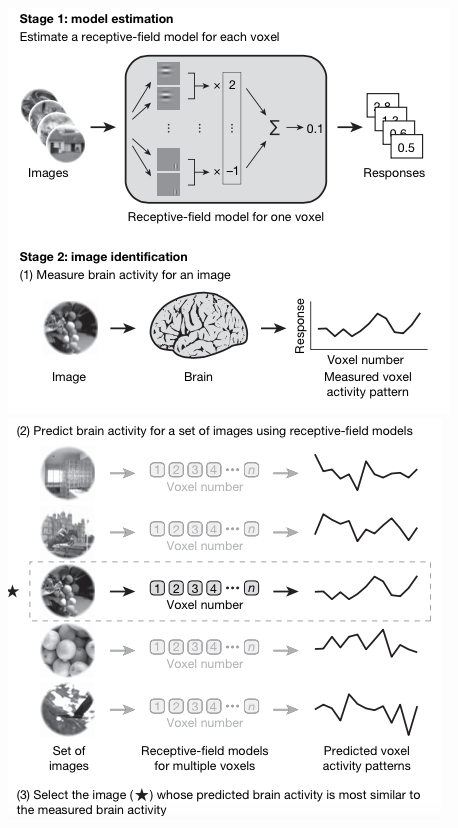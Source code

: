 \documentclass{beamer}
\begin{document}
\begin{frame}
\begin{center}
\includegraphics[scale = 0.4]{kay00.png}
\includegraphics[scale = 0.4]{kay01.png}
\end{center}
\end{frame}
\end{document}
